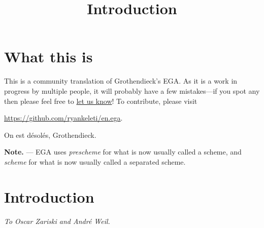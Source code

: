 


\title{Introduction}
\maketitle

\label{section-phantom}

\tableofcontents

\section*{What this is}
\label{section-what-this-is}

\noindent
This is a community translation of Grothendieck's EGA.
As it is a work in progress by multiple people, it will probably have a few
mistakes---if you spot any then please feel free to
\href{https://github.com/ryankeleti/en.ega/issues}{let us know}!
To contribute, please visit
\begin{center}
\url{https://github.com/ryankeleti/en.ega}.
\end{center}
On est d\'esol\'es, Grothendieck.

\medskip\noindent
{\bf Note.} --- EGA uses {\it prescheme} for what is now usually
called a scheme, and {\it scheme} for what is now usually called a separated scheme.

\section*{Introduction}
\label{section-intro}

\begin{flushright}
{\it To Oscar Zariski and Andr\'e Weil.}
\end{flushright}
\medskip

